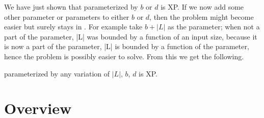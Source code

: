 We have just shown that \HL parameterized by $b$ or $d$ is XP.
If we now add some other parameter or parameters to either $b$ or $d$, then the problem
might become easier but surely stays in \XP.
For example take $b+|L|$ as the parameter;
when not a part of the parameter, |L| was bounded by a function of an input size,
because it is now a part of the parameter, |L| is bounded by a function of the parameter,
hence the problem is possibly easier to solve.
From this we get the following.

\begin{corollary}
    \HL parameterized by any variation of $|L|$, $b$, $d$ is XP.
\end{corollary}

\section{Overview}

\label{lem:allHDG:FPT:ColorsSize}
\label{lem:allHDGNash:XP:ColorsStrongNum}
\label{lem:allHDG:XP:ColorsTypes}
\label{lem:allHDGNash:XP:ColorsWeakNum}
\label{lem:allHDG:NPh:TypesNum}
\label{lem:allHDG:NPh:SizeTypes}
\label{lem:allHDG:FPT:StrongNumSize}
\label{lem:allHDG:XP:WeakNumSize}
\label{lem:allHDG:Wh:ColorsNumTypes}
\label{lem:allHDG:Wh:SizeTypeNum}

